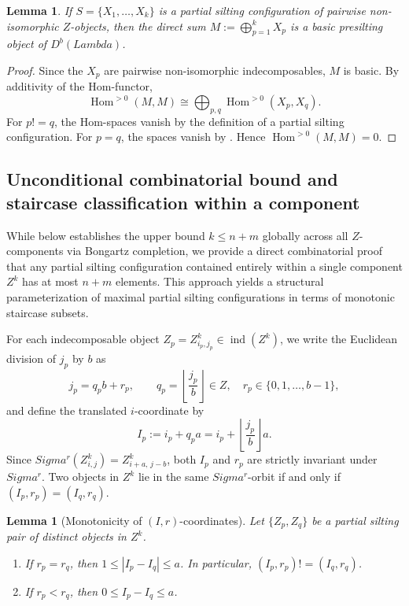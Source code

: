 \documentclass[11pt, a4paper]{article}
\newtheorem{lemma}[theorem]{Lemma}
\theoremstyle{definition}
\def\Lambda{Lambda}%
\def\Sigma{Sigma}%
\def\neq{!=}%
\def\mathbb#1{#1}%
\def\mathcal#1{#1}%
\def\Db{D^b}%
\newcommand{\Db}{\mathcal{D}^b}
\begin{document}
\begin{lemma}\label{lem:presilting}
If $S = \{X_1, \ldots, X_k\}$ is a partial silting configuration of pairwise non-isomorphic $\mathcal Z$-objects, then the direct sum $M := \bigoplus_{p=1}^k X_p$ is a basic presilting object of $\Db(\Lambda)$.
\end{lemma}

\begin{proof}
Since the $X_p$ are pairwise non-isomorphic indecomposables, $M$ is basic. By additivity of the Hom-functor,
\[
  \operatorname{Hom}^{>0}(M, M)
  \cong \bigoplus_{p,q} \operatorname{Hom}^{>0}(X_p, X_q).
\]
For $p \neq q$, the Hom-spaces vanish by the definition of a partial silting configuration. For $p = q$, the spaces vanish by . Hence $\operatorname{Hom}^{>0}(M, M) = 0$.
\end{proof}

\subsection{Unconditional combinatorial bound and staircase classification within a component}
\label{subsec:bound-combinatorial}

While  below establishes the upper bound $k \le n+m$ globally across all $\mathcal Z$-components via Bongartz completion, we provide a direct combinatorial proof that any partial silting configuration contained entirely within a single component $\mathcal Z^k$ has at most $n+m$ elements. This approach yields a structural parameterization of maximal partial silting configurations in terms of monotonic staircase subsets.

For each indecomposable object $Z_p = Z_{i_p, j_p}^k \in \operatorname{ind}(\mathcal Z^k)$, we write the Euclidean division of $j_p$ by $b$ as
\[
  j_p = q_p b + r_p, \qquad
  q_p = \left\lfloor \frac{j_p}{b} \right\rfloor \in \mathbb Z,
  \quad r_p \in \{0, 1, \ldots, b-1\},
\]
and define the translated $i$-coordinate by
\[
  I_p := i_p + q_p a = i_p + \left\lfloor \frac{j_p}{b} \right\rfloor a.
\]
Since $\Sigma^r(Z_{i,j}^k) = Z_{i+a, \, j-b}^k$, both $I_p$ and $r_p$ are strictly invariant under $\Sigma^r$. Two objects in $\mathcal Z^k$ lie in the same $\Sigma^r$-orbit if and only if $(I_p, r_p) = (I_q, r_q)$.

\begin{lemma}[Monotonicity of $(I,r)$-coordinates]\label{lem:Ir-monotonicity}
Let $\{Z_p, Z_q\}$ be a partial silting pair of distinct objects in $\mathcal Z^k$.
\begin{enumerate}[label=\textup{(\roman*)}]
  \item If $r_p = r_q$, then $1 \le |I_p - I_q| \le a$. In particular, $(I_p, r_p) \neq (I_q, r_q)$.
  \item If $r_p < r_q$, then $0 \le I_p - I_q \le a$.
\end{enumerate}
\end{lemma}
\end{document}
